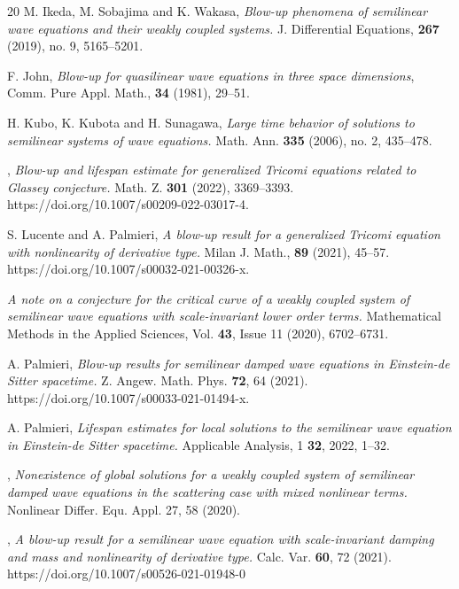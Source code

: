 \documentclass[12pt,leqno]{amsart}
\numberwithin{equation}{section}
\theoremstyle{remark}
\begin{document}
\begin{thebibliography}{20}
M. Ikeda, M. Sobajima and K. Wakasa,
{\it Blow-up phenomena of semilinear wave equations and their weakly coupled systems.} 
J. Differential Equations, {\bf 267} (2019), no. 9, 5165–5201.

{F. John}, {\it Blow-up for quasilinear wave equations in three space dimensions}, Comm. Pure Appl. Math., {\bf 34} (1981), 29--51.

{H. Kubo, K. Kubota and H. Sunagawa,} 
{\it Large time behavior of solutions to semilinear systems of wave equations.}
Math. Ann. {\bf 335} (2006), no. 2, 435--478.


,
{\it Blow-up and lifespan estimate for generalized Tricomi equations related to Glassey conjecture.} 	Math. Z. {\bf 301}  (2022), 3369--3393. https://doi.org/10.1007/s00209-022-03017-4.






 S. Lucente and A. Palmieri, 
{\it A blow-up result for a generalized Tricomi equation with
nonlinearity of derivative type.} Milan J. Math., {\bf 89}  (2021), 45--57. https://doi.org/10.1007/s00032-021-00326-x.


 {\it A note on a conjecture for the critical curve of a weakly coupled system of semilinear wave equations with scale-invariant lower order terms. } Mathematical Methods in the Applied Sciences, Vol. {\bf 43}, Issue 11 (2020), 6702--6731.

 A. Palmieri, 
{\it Blow-up results for semilinear damped wave equations in
Einstein-de Sitter spacetime.} Z. Angew. Math. Phys. {\bf 72}, 64 (2021). https://doi.org/10.1007/s00033-021-01494-x.

 A. Palmieri, 
{\it Lifespan estimates for local solutions to the semilinear wave equation in Einstein-de
Sitter spacetime.} Applicable Analysis, 1 {\bf 32}, 2022, 1--32.



,
{\it  Nonexistence of global solutions for a weakly coupled system of semilinear damped wave equations in the scattering case with mixed nonlinear terms.}  	Nonlinear Differ. Equ. Appl. 27, 58 (2020).




,
{\it A blow-up result for a semilinear wave equation with scale-invariant damping and mass and nonlinearity of derivative type.} Calc. Var. {\bf 60}, 72 (2021). https://doi.org/10.1007/s00526-021-01948-0




\end{thebibliography}
\end{document}

